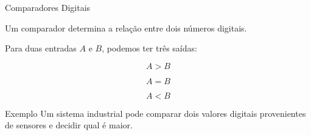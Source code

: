 \begin{frame}{Comparadores Digitais}

    Um comparador determina a relação entre dois números digitais.

    Para duas entradas $A$ e $B$, podemos ter três saídas:

    \[
        A>B
    \]

    \[
        A=B
    \]

    \[
        A<B
    \]

    \vspace{0.3cm}

    \begin{block}{Exemplo}
        Um sistema industrial pode comparar dois valores digitais
        provenientes de sensores e decidir qual é maior.
    \end{block}

\end{frame}